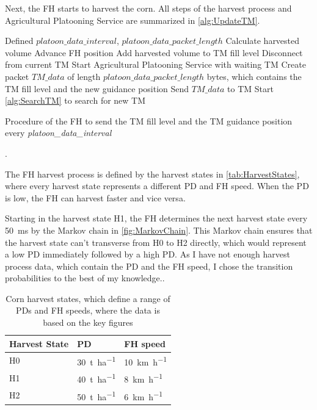 Next, the \ac{FH} starts to harvest the corn.
All steps of the harvest process and Agricultural Platooning Service are summarized in
\autoref{alg:UpdateTM}.

\begin{algorithm}
\begin{algorithmic}[1]
\REQUIRE Defined $platoon\_data\_interval$, $platoon\_data\_packet\_length$
\STATE Calculate harvested volume
\STATE Advance \ac{FH} position
\STATE Add harvested volume to \ac{TM} fill level
    \STATE Disconnect from current \ac{TM}
	\STATE Start Agricultural Platooning Service with waiting \ac{TM}
\ELSE
	\STATE Create packet $TM\_data$ of length $platoon\_data\_packet\_length$ bytes, which contains the \ac{TM} fill level and the new guidance position
	\STATE Send $TM\_data$ to \ac{TM}
		\STATE Start \autoref{alg:SearchTM} to search for new \ac{TM}
	\ENDIF
\ENDIF
\end{algorithmic}
\caption{Procedure of the \acf{FH} to send the \acf{TM} fill level and the \ac{TM} guidance position every
\textit{platoon\_data\_interval}}.
\label{alg:UpdateTM}
\end{algorithm}

The FH harvest process is defined by the harvest states in \autoref{tab:HarvestStates},
where every harvest state represents a different \ac{PD} and \ac{FH} speed.
When the \ac{PD} is low, the \ac{FH} can harvest faster and vice versa.

Starting in the harvest state H1, the \ac{FH} determines the next harvest state every \SI{50}{\milli\second}
by the Markov chain in \autoref{fig:MarkovChain}.
This Markov chain ensures that the harvest state can't transverse from H0 to H2 directly, which would represent
a low \ac{PD} immediately followed by a high \ac{PD}.
As I have not enough harvest process data, which contain the \ac{PD} and the \ac{FH} speed,
I chose the transition probabilities to the best of my knowledge..

\begin{table}[H]
	\centering
	\begin{tabular}{>{\centering}p{2cm}p{4cm}p{4cm}}
		\toprule
		Harvest State & \ac{PD} & \ac{FH} speed\\
		\midrule
		H0 & \SI{30}{\tonne\per\hectare}
        & \SI{10}{\kilo\metre\per\hour} \\
		H1 & \SI{40}{\tonne\per\hectare}
        & \SI{8}{\kilo\metre\per\hour} \\
		H2 & \SI{50}{\tonne\per\hectare}
        & \SI{6}{\kilo\metre\per\hour} \\
		\bottomrule
	\end{tabular}
	\caption{Corn harvest states, which define a range of \acf{PD}s and \acf{FH} speeds, where the data is based on the
	key figures \cite{faustzahlen2018}}
	\label{tab:markov_chain}
\end{table}

